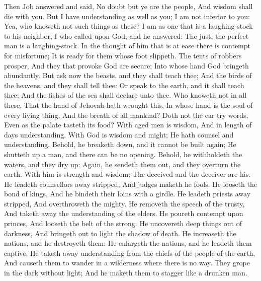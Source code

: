 Then Job answered and said,  No doubt but ye are the people, And wisdom shall die with you.  But I have understanding as well as you; I am not inferior to you: Yea, who knoweth not such things as these?  I am as one that is a laughing-stock to his neighbor, I who called upon God, and he answered: The just, the perfect man is a laughing-stock.  In the thought of him that is at ease there is contempt for misfortune; It is ready for them whose foot slippeth.  The tents of robbers prosper, And they that provoke God are secure; Into whose hand God bringeth abundantly.  But ask now the beasts, and they shall teach thee; And the birds of the heavens, and they shall tell thee:  Or speak to the earth, and it shall teach thee; And the fishes of the sea shall declare unto thee.  Who knoweth not in all these, That the hand of Jehovah hath wrought this,  In whose hand is the soul of every living thing, And the breath of all mankind?  Doth not the ear try words, Even as the palate tasteth its food?  With aged men is wisdom, And in length of days understanding.  With God is wisdom and might; He hath counsel and understanding.  Behold, he breaketh down, and it cannot be built again; He shutteth up a man, and there can be no opening.  Behold, he withholdeth the waters, and they dry up; Again, he sendeth them out, and they overturn the earth.  With him is strength and wisdom; The deceived and the deceiver are his.  He leadeth counsellors away stripped, And judges maketh he fools.  He looseth the bond of kings, And he bindeth their loins with a girdle.  He leadeth priests away stripped, And overthroweth the mighty.  He removeth the speech of the trusty, And taketh away the understanding of the elders.  He poureth contempt upon princes, And looseth the belt of the strong.  He uncovereth deep things out of darkness, And bringeth out to light the shadow of death.  He increaseth the nations, and he destroyeth them: He enlargeth the nations, and he leadeth them captive.  He taketh away understanding from the chiefs of the people of the earth, And causeth them to wander in a wilderness where there is no way.  They grope in the dark without light; And he maketh them to stagger like a drunken man. 

